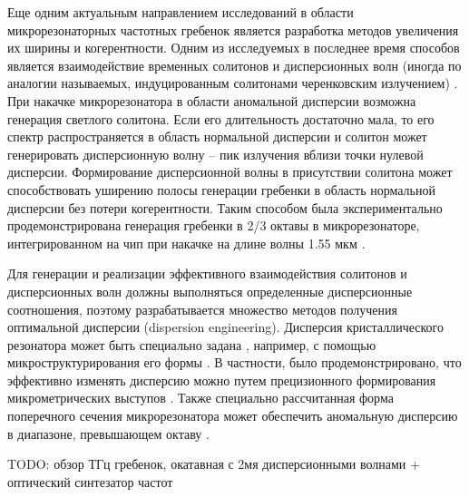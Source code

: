 Еще одним актуальным направлением исследований в области микрорезонаторных частотных гребенок является разработка методов увеличения их ширины и когерентности. Одним из исследуемых в последнее время способов является взаимодействие временных солитонов и дисперсионных волн (иногда по аналогии называемых, индуцированным  солитонами черенковским излучением) \cite{Brasch2016,Akhmediev1995,Barashenkov2011,Jang2014,Milian2014,Yang2016}. При накачке микрорезонатора в области аномальной дисперсии возможна генерация светлого солитона. Если его длительность достаточно мала, то его спектр распространяется в область нормальной дисперсии и солитон может генерировать дисперсионную волну – пик излучения вблизи точки нулевой дисперсии. Формирование дисперсионной волны в присутствии солитона может способствовать уширению полосы генерации гребенки в область нормальной дисперсии без потери когерентности. Таким способом была экспериментально продемонстрирована генерация гребенки в 2/3 октавы в микрорезонаторе, интегрированном на чип при накачке на длине волны 1.55 мкм \cite{Brasch2016}.


Для генерации и реализации эффективного взаимодействия солитонов и дисперсионных волн должны выполняться определенные дисперсионные соотношения, поэтому разрабатывается множество методов получения оптимальной дисперсии (dispersion engineering). Дисперсия кристаллического резонатора может быть специально задана \cite{Grudinin2012,Jiang2014,Okawachi2014,Zhang2014,Zhang2013,Grudinin2015,Nakagawa2016}, например, с помощью микроструктурирования его формы \cite{Grudinin2015,Nakagawa2016}. В частности, было продемонстрировано, что эффективно изменять дисперсию можно путем прецизионного формирования микрометрических выступов \cite{Grudinin2015}. Также специально рассчитанная форма поперечного сечения микрорезонатора может обеспечить аномальную дисперсию в диапазоне, превышающем октаву \cite{Nakagawa2016}.

TODO: обзор ТГц гребенок, окатавная с 2мя дисперсионными волнами + оптический синтезатор частот

